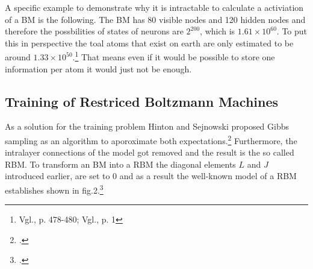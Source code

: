 A specific example to demonstrate why it is intractable to calculate a activiation of a \ac{BM} is the following. The \ac{BM} has 80 visible nodes and 120 hidden nodes and therefore the possbilities of states of neurons are \( 2^{200} \), which is \( 1.61 \times 10^{60}\). 
To put this in perspective the toal atoms that exist on earth are only estimated to be around \( 1.33 \times 10^{50}\).\footnote{Vgl.\cite{helmenstineHowManyAtoms2022}, p. 478-480; Vgl.\cite{schlammingerCoolWayMeasure2014}, p. 1}
That means even if it would be possible to store one information per atom it would just not be enough. 

\subsection{Training of Restriced Boltzmann Machines}

As a solution for the training problem Hinton and Sejnowski proposed Gibbs sampling as an algorithm to aporoximate both expectations.\footcite[Vgl.][158-165]{ackleyLearningAlgorithmBoltzmann1985}
Furthermore, the intralayer connections of the model got removed and the result is the so called \ac{RBM}.
To transform an \ac{BM} into a \ac{RBM} the diagonal elements \( L \) and \( J \)  introduced earlier, are set to 0 and as a result the well-known model of a \ac{RBM} establishes shown in fig.2.\footcite[Vgl.][449]{salakhutdinovDeepBoltzmannMachines2009}

